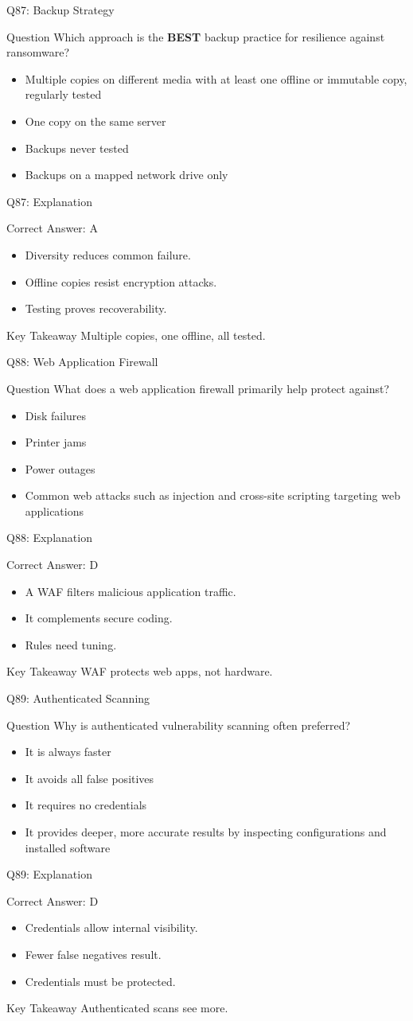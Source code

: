\documentclass[aspectratio=169]{beamer}
\newcommand{\hq}[7]{%
	\begin{frame}{Q#1: #2}
		\begin{block}{Question}
			#3
		\end{block}
		\begin{itemize}
			#4
		\end{itemize}
	\end{frame}
	\begin{frame}{Q#1: Explanation}
		\begin{block}{Correct Answer: #5}
			\begin{itemize}
				#6
			\end{itemize}
		\end{block}
		\begin{alertblock}{Key Takeaway}
			#7
		\end{alertblock}
	\end{frame}
}
\begin{document}
	\hq{87}{Backup Strategy}
	{Which approach is the \textbf{BEST} backup practice for resilience against ransomware?}
	{\item[\textbf{(A)}] Multiple copies on different media with at least one offline or immutable copy, regularly tested
		\item[\textbf{(B)}] One copy on the same server
		\item[\textbf{(C)}] Backups never tested
		\item[\textbf{(D)}] Backups on a mapped network drive only}
	{A}
	{\item Diversity reduces common failure.
		\item Offline copies resist encryption attacks.
		\item Testing proves recoverability.}
	{Multiple copies, one offline, all tested.}
	
	\hq{88}{Web Application Firewall}
	{What does a web application firewall primarily help protect against?}
	{\item[\textbf{(A)}] Disk failures
		\item[\textbf{(B)}] Printer jams
		\item[\textbf{(C)}] Power outages
		\item[\textbf{(D)}] Common web attacks such as injection and cross-site scripting targeting web applications}
	{D}
	{\item A WAF filters malicious application traffic.
		\item It complements secure coding.
		\item Rules need tuning.}
	{WAF protects web apps, not hardware.}
	
	\hq{89}{Authenticated Scanning}
	{Why is authenticated vulnerability scanning often preferred?}
	{\item[\textbf{(A)}] It is always faster
		\item[\textbf{(B)}] It avoids all false positives
		\item[\textbf{(C)}] It requires no credentials
		\item[\textbf{(D)}] It provides deeper, more accurate results by inspecting configurations and installed software}
	{D}
	{\item Credentials allow internal visibility.
		\item Fewer false negatives result.
		\item Credentials must be protected.}
	{Authenticated scans see more.}
	
\end{document}
